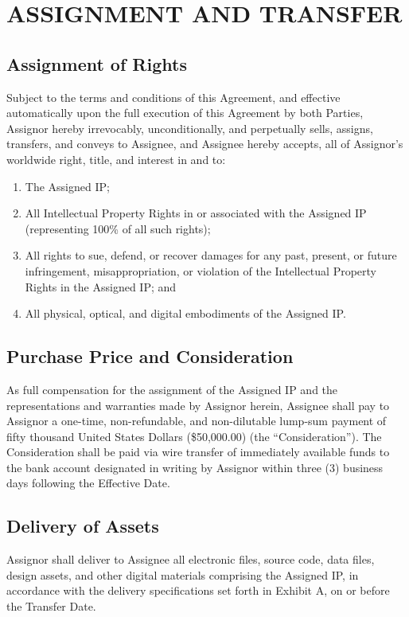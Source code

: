 \section{ASSIGNMENT AND TRANSFER}

\subsection{Assignment of Rights}
Subject to the terms and conditions of this Agreement, and effective automatically upon the full execution of this Agreement by both Parties, Assignor hereby irrevocably, unconditionally, and perpetually sells, assigns, transfers, and conveys to Assignee, and Assignee hereby accepts, all of Assignor's worldwide right, title, and interest in and to:
\begin{enumerate}
  \item The Assigned IP;
  \item All Intellectual Property Rights in or associated with the Assigned IP (representing 100\% of all such rights);
  \item All rights to sue, defend, or recover damages for any past, present, or future infringement, misappropriation, or violation of the Intellectual Property Rights in the Assigned IP; and
  \item All physical, optical, and digital embodiments of the Assigned IP.
\end{enumerate}

\subsection{Purchase Price and Consideration}
As full compensation for the assignment of the Assigned IP and the representations and warranties made by Assignor herein, Assignee shall pay to Assignor a one-time, non-refundable, and non-dilutable lump-sum payment of fifty thousand United States Dollars (\$50,000.00) (the ``Consideration''). The Consideration shall be paid via wire transfer of immediately available funds to the bank account designated in writing by Assignor within three (3) business days following the Effective Date.

\subsection{Delivery of Assets}
Assignor shall deliver to Assignee all electronic files, source code, data files, design assets, and other digital materials comprising the Assigned IP, in accordance with the delivery specifications set forth in Exhibit A, on or before the Transfer Date.

